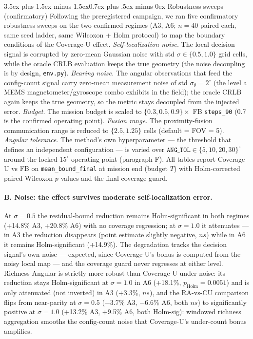 \documentclass[journal]{IEEEtran}
\makeatletter
\newcommand{\CU}{Coverage-U}
\newcommand{\RA}{Richness-Angular}
\renewcommand{\subsection}{\@startsection{subsection}{2}{\z@}%
{3.5ex plus 1.5ex minus 1.5ex}{0.7ex plus .5ex minus 0ex}%
{\normalfont\normalsize\bfseries}}
\makeatother
\begin{document}
\subsection{Robustness sweeps (confirmatory)}
Following the preregistered campaign, we ran five confirmatory robustness
sweeps on the two confirmed regimes (A3, A6; $n = 40$ paired each, same seed
ladder, same
Wilcoxon + Holm protocol) to map the boundary conditions of the \CU{} effect.
\emph{Self-localization noise.} The local decision signal is corrupted by
zero-mean Gaussian noise with std $\sigma \in \{0.5, 1.0\}$ grid cells, while
the oracle CRLB evaluation keeps the true geometry (the noise decoupling is by
design, \texttt{env.py}). \emph{Bearing noise.} The angular observations that
feed the config-count signal carry zero-mean measurement noise of std
$\sigma_\theta = 2^\circ$ (the level a MEMS magnetometer/gyroscope combo
exhibits in the field); the oracle CRLB again keeps the true geometry, so the
metric stays decoupled from the injected error. \emph{Budget.} The mission
budget is scaled to $\{0.3, 0.5, 0.9\} \times$ FB \texttt{steps\_90} (0.7 is
the confirmed operating point). \emph{Fusion range.} The proximity-fusion
communication range is reduced to $\{2.5, 1.25\}$ cells (default =
FOV = 5). \emph{Angular tolerance.} The method's own hyperparameter --- the
threshold that defines an independent configuration --- is varied over
$\texttt{ANG\_TOL} \in \{5, 10, 20, 30\}^\circ$ around the locked $15^\circ$
operating point (paragraph F). All tables report \CU{} vs FB on
\texttt{mean\_bound\_final} at mission end (budget $T$) with Holm-corrected
paired Wilcoxon $p$-values and the final-coverage guard.

\paragraph{B. Noise: the effect survives moderate self-localization error.}
At $\sigma = 0.5$ the residual-bound reduction remains Holm-significant in both
regimes (+14.8\% A3, +20.8\% A6) with no coverage regression; at $\sigma = 1.0$
it attenuates --- in A3 the reduction disappears (point estimate slightly
negative, $ns$) while in A6 it remains Holm-significant (+14.9\%). The
degradation tracks the decision signal's own noise --- expected, since
\CU's{} bonus is computed from the noisy local map --- and the coverage guard
never regresses at either level. \RA{} is strictly more robust than \CU{}
under noise: its reduction stays Holm-significant at $\sigma = 1.0$ in A6
(+18.1\%, $p_{\text{Holm}} = 0.0051$) and is only attenuated (not inverted) in
A3 (+3.3\%, $ns$), and the RA-vs-CU comparison flips from near-parity at
$\sigma = 0.5$ ($-3.7\%$ A3, $-6.6\%$ A6, both $ns$) to significantly positive
at $\sigma = 1.0$ (+13.2\% A3, +9.5\% A6, both Holm-sig): windowed richness
aggregation smooths the config-count noise that \CU's{} under-count bonus
amplifies.
\end{document}

